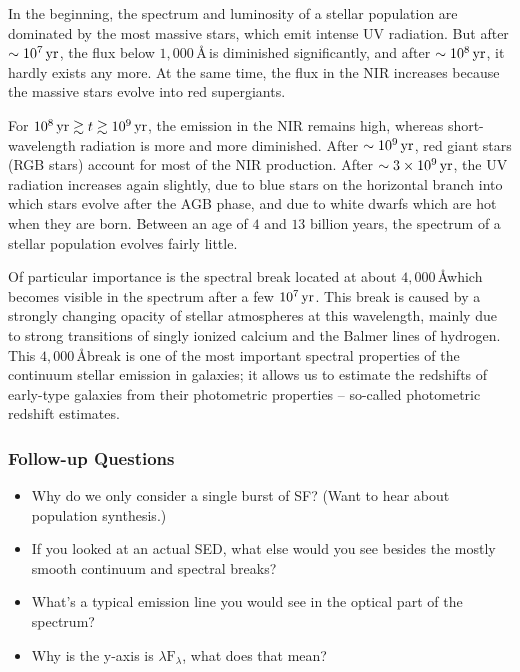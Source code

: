 \documentclass[a4paper,11pt]{article}
\begin{document}
{\noindent}In the beginning, the spectrum and luminosity of a stellar population are dominated by the most massive stars, which emit intense UV radiation. But after $\sim10^7\,{\rm yr}$, the flux below $1,000$\,\AA\,is diminished significantly, and after $\sim10^8\,{\rm yr}$, it hardly exists any more. At the same time, the flux in the NIR increases because the massive stars evolve into red supergiants.

{\noindent}For $10^8\,{\rm yr}\gtrsim t\gtrsim10^9\,{\rm yr}$, the emission in the NIR remains high, whereas short-wavelength radiation is more and more diminished. After $\sim10^9\,{\rm yr}$, red giant stars (RGB stars) account for most of the NIR production. After $\sim3\times10^9\,{\rm yr}$, the UV radiation increases again slightly, due to blue stars on the horizontal branch into which stars evolve after the AGB phase, and due to white dwarfs which are hot when they are born. Between an age of $4$ and $13$ billion years, the spectrum of a stellar population evolves fairly little. 

{\noindent}Of particular importance is the spectral break located at about $4,000$\,\AA which becomes visible in the spectrum after a few $10^7\,{\rm yr}$. This break is caused by a strongly changing opacity of stellar atmospheres at this wavelength, mainly due to strong transitions of singly ionized calcium and the Balmer lines of hydrogen. This $4,000$\,\AA break is one of the most important spectral properties of the continuum stellar emission in galaxies; it allows us to estimate the redshifts of early-type galaxies from their photometric properties -- so-called photometric redshift estimates.

\subsubsection{Follow-up Questions}

\begin{itemize}
    \item Why do we only consider a single burst of SF? (Want to hear about population synthesis.)
    \item If you looked at an actual SED, what else would you see besides the mostly smooth continuum and spectral breaks?
    \item What's a typical emission line you would see in the optical part of the spectrum?
    \item Why is the y-axis is $\lambda\mathrm{F}_\lambda$, what does that mean?
\end{itemize}
\end{document}
